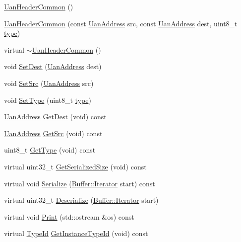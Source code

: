 \begin{DoxyCompactItemize}
\item 
\hyperlink{classns3_1_1UanHeaderCommon_a5799380b4db26dea22d985fc775fca85}{Uan\+Header\+Common} ()
\item 
\hyperlink{classns3_1_1UanHeaderCommon_a2651a5fb15c775ade659d69cbdb9a417}{Uan\+Header\+Common} (const \hyperlink{classns3_1_1UanAddress}{Uan\+Address} src, const \hyperlink{classns3_1_1UanAddress}{Uan\+Address} dest, uint8\+\_\+t \hyperlink{visualizer-ideas_8txt_add98db9e15e2a58cf2b57623e7aa893a}{type})
\item 
virtual \hyperlink{classns3_1_1UanHeaderCommon_a02f76fa4294c1995526d974f2719c2ce}{$\sim$\+Uan\+Header\+Common} ()
\item 
void \hyperlink{classns3_1_1UanHeaderCommon_a6baf0ad4c6e21442e800d7992117f574}{Set\+Dest} (\hyperlink{classns3_1_1UanAddress}{Uan\+Address} dest)
\item 
void \hyperlink{classns3_1_1UanHeaderCommon_a7a640d32baa90ecf4c97f82b27363be1}{Set\+Src} (\hyperlink{classns3_1_1UanAddress}{Uan\+Address} src)
\item 
void \hyperlink{classns3_1_1UanHeaderCommon_abd00dd829dd7400be151264f90e62ad5}{Set\+Type} (uint8\+\_\+t \hyperlink{visualizer-ideas_8txt_add98db9e15e2a58cf2b57623e7aa893a}{type})
\item 
\hyperlink{classns3_1_1UanAddress}{Uan\+Address} \hyperlink{classns3_1_1UanHeaderCommon_a107704e911d45bde731a342fda5af9bc}{Get\+Dest} (void) const 
\item 
\hyperlink{classns3_1_1UanAddress}{Uan\+Address} \hyperlink{classns3_1_1UanHeaderCommon_ae0476cf0e1c33d85050d2fc64d21d1a9}{Get\+Src} (void) const 
\item 
uint8\+\_\+t \hyperlink{classns3_1_1UanHeaderCommon_a22891c94a012f0410ab67c661d857915}{Get\+Type} (void) const 
\item 
virtual uint32\+\_\+t \hyperlink{classns3_1_1UanHeaderCommon_afb5ab80bb39e33b3736d64165e19abf8}{Get\+Serialized\+Size} (void) const 
\item 
virtual void \hyperlink{classns3_1_1UanHeaderCommon_a71fac691e6af9995a1be47cd7f6b5004}{Serialize} (\hyperlink{classns3_1_1Buffer_1_1Iterator}{Buffer\+::\+Iterator} start) const 
\item 
virtual uint32\+\_\+t \hyperlink{classns3_1_1UanHeaderCommon_a7328718e5445a44c009a5003d5635f0f}{Deserialize} (\hyperlink{classns3_1_1Buffer_1_1Iterator}{Buffer\+::\+Iterator} start)
\item 
virtual void \hyperlink{classns3_1_1UanHeaderCommon_a45bc9d2cec6c55bdde7b1d6715d0486c}{Print} (std\+::ostream \&os) const 
\item 
virtual \hyperlink{classns3_1_1TypeId}{Type\+Id} \hyperlink{classns3_1_1UanHeaderCommon_a519c07bd608a32a895110322200117ee}{Get\+Instance\+Type\+Id} (void) const 
\end{DoxyCompactItemize}
